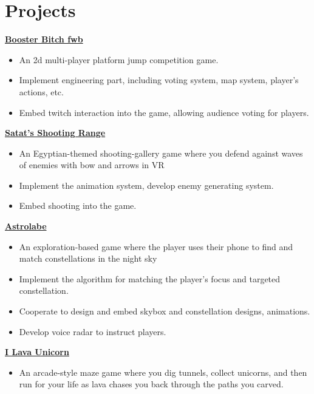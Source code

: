 \documentclass{article}
\begin{document}
{		\section{Projects}
		\vspace{5pt}
		\textbf{\href{http://www.plutoshe.com/blog/BoosterBitchfwb}{Booster Bitch fwb}} \hfill \quad
		
		\begin{itemize}
			\item An 2d multi-player platform jump competition game.
			\item Implement engineering part, including voting system, map system, player's actions, etc.
			\item Embed twitch interaction into the game, allowing audience voting for players.
		\end{itemize}
	
		\textbf{\href{http://www.plutoshe.com/blog/Satat'sShootingRange}{Satat's Shooting Range}} \hfill \quad
		
		\begin{itemize}
			\item An  Egyptian-themed shooting-gallery game where you defend against waves of enemies with bow and arrows in VR
			\item Implement the animation system, develop enemy generating system.
			\item Embed shooting into the game.
		\end{itemize}
		
		
		\textbf{\href{http://www.plutoshe.com/blog/Astrolabe}{Astrolabe}} \hfill \quad
		
		\begin{itemize}
			\item An exploration-based game where the player uses their phone to find and match constellations in the night sky
			\item Implement the algorithm for matching the player's focus and targeted constellation.			
			\item Cooperate to design and embed skybox and constellation designs, animations.	
			\item Develop voice radar to instruct players.
			

		\end{itemize}
		
		
		
		\textbf{\href{http://www.plutoshe.com/blog/ILavaUnicorn}{I Lava Unicorn}} \hfill \quad
		
		\begin{itemize}
			\item An arcade-style maze game where you dig tunnels, collect unicorns, and then run for your life as lava chases you back through the paths you carved.
			

\end{itemize}}
\end{document}
